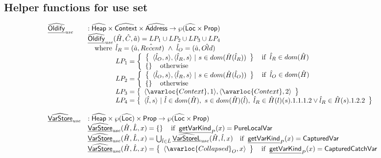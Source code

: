 \subsection{Helper functions for use set}
\[
\begin{array}{ll}
  \ahf{Oldify}_{\it use} & : \aHeap \times \abs{Context} \times \abs{Address} \rightarrow \powerset{\aLoc \times \SF{Prop}}\\
  & \ahf{Oldify}_{\it use}(\hat{H},\hat{C},\hat{a}) = LP_1 \cup LP_2 \cup LP_3 \cup LP_4\\
  & \quad\wherec{
    \hat{l}_R = (\hat{a}, \hat{Recent})\ \land\ \hat{l}_O = (\hat{a}, \hat{Old})\\
    LP_1 = \left\{
      \begin{array}{l}
      \set{ \langle\hat{l}_O,s\rangle, \langle\hat{l}_R,s\rangle ~|~ s\in dom(\hat{H}(\hat{l}_R))} \quad\ifc{\hat{l}_R \in dom(\hat{H})} \\
      \set{} \quad\owc
      \end{array}
    \right.\\
    LP_2 = \left\{
      \begin{array}{l}
      \set{ \langle\hat{l}_O,s\rangle, \langle\hat{l}_R,s\rangle ~|~ s\in dom(\hat{H}(\hat{l}_O))} \quad\ifc{\hat{l}_O \in dom(\hat{H})} \\
      \set{} \quad\owc
      \end{array}
    \right.\\
    LP_3 = \set{ \langle\avarloc{Context}, 1\rangle, \langle\avarloc{Context}, 2\rangle } \\
    LP_4 = \set{\langle \hat{l}, s\rangle ~|~ \hat{l}\in dom(\hat{H}),~s\in dom(\hat{H})(\hat{l}),~ \hat{l}_R\in\hat{H}(l)(s).1.1.1.2\lor \hat{l}_R\in\hat{H}(s).1.2.2}
  }
\\\\
\ahf{VarStore}_{\it use} & : \aHeap \times \powerset{\aLoc}\times \SF{Prop} \rightarrow \powerset{\aLoc \times \SF{Prop}}\\
& \ahf{VarStore}_{\it use}(\hat{H}, \hat{L}, x)
= \set{} \quad\ifc{\chf{getVarKind}_P(x) = \SF{PureLocalVar}}\\
& \ahf{VarStore}_{\it use}(\hat{H}, \hat{L}, x)
= \bigcup_{\hat{l}\in\hat{L}}\ahf{VarStoreL}_{\it use}(\hat{H},\hat{l},x) \quad\ifc{\chf{getVarKind}_P(x) = \SF{CapturedVar}}\\
& \ahf{VarStore}_{\it use}(\hat{H}, \hat{L}, x)
= \set{\langle\avarloc{Collapsed}_O,x\rangle}\quad\ifc{\chf{getVarKind}_P(x) = \SF{CapturedCatchVar}}\\

\end{array}\]
